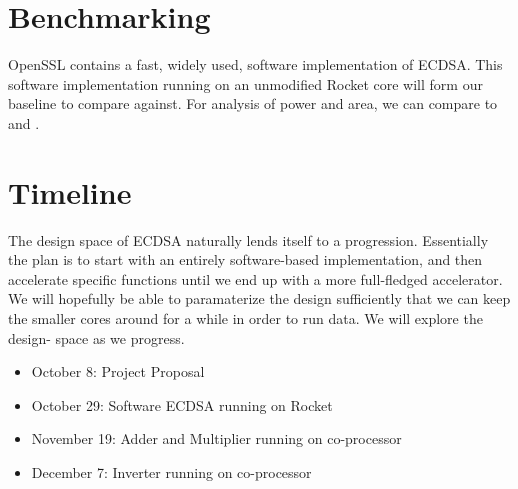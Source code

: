 \documentclass[twocolumn]{article}
\begin{document}
\section{Benchmarking}

OpenSSL contains a fast, widely used, software implementation of
ECDSA\cite{kasper-openssl_ecc}.  This software implementation running
on an unmodified Rocket core will form our baseline to compare
against. For analysis of power and area, we can compare to \cite{mmm-hw_ecc} 
and \cite{nnll-ecdsa_hw}. 

\section{Timeline}

The design space of ECDSA naturally lends itself to a progression.
Essentially the plan is to start with an entirely software-based
implementation, and then accelerate specific functions until we end up
with a more full-fledged accelerator.  We will hopefully be able
to paramaterize the design sufficiently that we can keep the smaller
cores around for a while in order to run data. We will explore the design-
space as we progress.

\begin{itemize}
\item October 8: Project Proposal
\item October 29: Software ECDSA running on Rocket
\item November 19: Adder and Multiplier running on co-processor
\item December 7: Inverter running on co-processor
\end{itemize}



\end{document}
